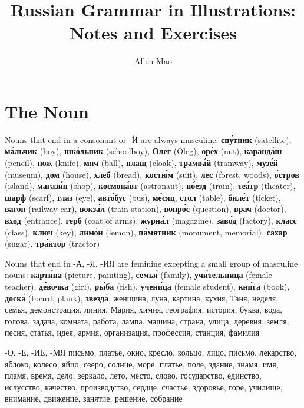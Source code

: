 \documentclass{article}
\title{Russian Grammar in Illustrations: Notes and Exercises}
\author{Allen Mao}
\begin{document}
\maketitle

\section{The Noun}
Nouns that end in a consonant or -Й are always masculine:
\textbf{сп\'{у}тник} (satellite), \textbf{м\'{а}льчик} (boy), \textbf{шк\'{о}льник} (schoolboy), \textbf{Ол\'{е}г} (Oleg), \textbf{ор\'{е}х} (nut), \textbf{каранд\'{а}ш} (pencil), \textbf{нож} (knife), \textbf{мяч} (ball), \textbf{плащ} (cloak), \textbf{трамв\'{а}й} (tramway), \textbf{муз\'{е}й} (museum), \textbf{дом} (house), \textbf{хлеб} (bread), \textbf{кост\'{ю}м} (suit), \textbf{лес} (forest, woods), \textbf{\'{о}стров} (island), \textbf{магаз\'{и}н} (shop), \textbf{космон\'{а}вт} (astronaut), \textbf{п\'{о}езд} (train), \textbf{те\'{а}тр} (theater), \textbf{шарф} (scarf), \textbf{глаз} (eye), \textbf{авт\'{о}бус} (bus), \textbf{м\'{е}сяц}, \textbf{стол} (table), \textbf{бил\'{е}т} (ticket), \textbf{ваг\'{о}н} (railway car), \textbf{вокз\'{а}л} (train station), \textbf{вопр\'{о}с} (question), \textbf{врач} (doctor), \textbf{вход} (entrance), \textbf{герб} (coat of arms), \textbf{журн\'{а}л} (magazine), \textbf{зав\'{о}д} (factory), \textbf{класс} (class), \textbf{ключ} (key), \textbf{лим\'{о}н} (lemon), \textbf{п\'{а}мятник} (monument, memorial), \textbf{с\'{а}хар} (sugar), \textbf{тр\'{а}ктор} (tractor)

Nouns that end in -А, -Я. -ИЯ are feminine excepting a small group of masculine nouns:
\textbf{карт\'{и}на} (picture, painting), \textbf{семь\'{я}} (family), \textbf{уч\'{и}тельница} (female teacher), \textbf{д\'{е}вочка} (girl), \textbf{р\'{ы}ба} (fish), \textbf{учен\'{и}ца} (female student), \textbf{кн\'{и}га} (book), \textbf{доск\'{а}} (board, plank), \textbf{звезд\'{а}}, женщина, луна, картина, кухня, Таня, неделя, семья, демонстрация, линия, Мария, химия, география, история, буква, вода, голова, задача, комната, работа, лампа, машина, страна, улица, деревня, земля, песня, статья, идея, армия, организация, профессия, станция, фамилия

-О, -Е, -ИЕ, -МЯ
письмо, платье, окно, кресло, кольцо, лицо, письмо, лекарство, яблоко, колесо, яйцо, озеро, солнце, море, платье, поле, здание, знамя, имя, пламя, время, дело, зеркало, лето, место, слово, государство, единство, ислусство, качество, производство, сердце, счастье, здоровье, горе, училище, внимание, движение, занятие, решение, собрание
\end{document}
